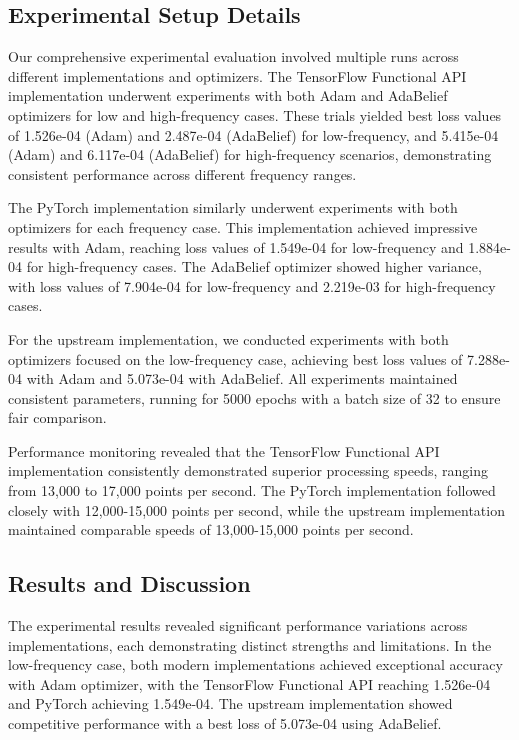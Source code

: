 \documentclass[10pt,journal,compsoc,onecolumn]{IEEEtran}
\begin{document}
\subsection{Experimental Setup Details}
Our comprehensive experimental evaluation involved multiple runs across different implementations and optimizers. The TensorFlow Functional API implementation underwent experiments with both Adam and AdaBelief optimizers for low and high-frequency cases. These trials yielded best loss values of 1.526e-04 (Adam) and 2.487e-04 (AdaBelief) for low-frequency, and 5.415e-04 (Adam) and 6.117e-04 (AdaBelief) for high-frequency scenarios, demonstrating consistent performance across different frequency ranges.

The PyTorch implementation similarly underwent experiments with both optimizers for each frequency case. This implementation achieved impressive results with Adam, reaching loss values of 1.549e-04 for low-frequency and 1.884e-04 for high-frequency cases. The AdaBelief optimizer showed higher variance, with loss values of 7.904e-04 for low-frequency and 2.219e-03 for high-frequency cases.

For the upstream implementation, we conducted experiments with both optimizers focused on the low-frequency case, achieving best loss values of 7.288e-04 with Adam and 5.073e-04 with AdaBelief. All experiments maintained consistent parameters, running for 5000 epochs with a batch size of 32 to ensure fair comparison.

Performance monitoring revealed that the TensorFlow Functional API implementation consistently demonstrated superior processing speeds, ranging from 13,000 to 17,000 points per second. The PyTorch implementation followed closely with 12,000-15,000 points per second, while the upstream implementation maintained comparable speeds of 13,000-15,000 points per second.

\subsection{Results and Discussion}
The experimental results revealed significant performance variations across implementations, each demonstrating distinct strengths and limitations. In the low-frequency case, both modern implementations achieved exceptional accuracy with Adam optimizer, with the TensorFlow Functional API reaching 1.526e-04 and PyTorch achieving 1.549e-04. The upstream implementation showed competitive performance with a best loss of 5.073e-04 using AdaBelief.
\end{document}
